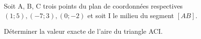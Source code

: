 \documentclass[11pt,a4paper]{article}  %
\newcommand{\axeOI}[3][0]{\draw[axe] (#2,#1)--(#3,#1);  \draw (1,#1) node {\small $+$}; \draw (1,#1) node[below] {\small $I$};}
\newcommand{\axeOJ}[3][0]{\draw[axe] (#1,#2)--(#1,#3); \draw (#1, 1) node {\small $+$}; \draw (#1, 1) node[left] {\small $J$};}
\newcommand{\origineO}{\draw (0,0) node[below left] {$O$};}
\newcommand{\point}[4]{\draw (#1,#2) node[#4] {$#3$};}
\newcommand{\pointGraphique}[4]{\draw (#1,#2) node[#4] {$#3$};
	\draw (#1,#2) node {$+$};}
\begin{document}
Soit A, B, C trois points du plan de coordonnées respectives $(1 ; 5),(-7 ; 3),(0 ;-2)$ et soit I le milieu du segment $[A B]$.

Déterminer la valeur exacte de l'aire du triangle ACI.

%		
%		
%	
\end{document}
